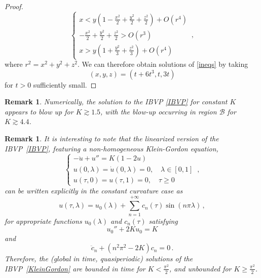 \documentclass[10pt]{amsart}
\newtheorem{Remark}[Thm]{Remark}
\begin{document}
\begin{proof}
\begin{equation} \label{ineqs}
\begin{cases}
x < y \left( 1 - \frac{x^2}2 + \frac{y^2}2 + \frac{z^2}2 \right) + O(r^4) \\
- \frac{x^2}2 + \frac{y^2}2 + \frac{z^2}2 > O(r^3) \\
x > y \left( 1 + \frac{y^2}3 + \frac{z^2}3 \right) + O(r^4) 
\end{cases} 
\, ,
\end{equation}
where $r^2 = x^2 + y^2 + z^2$. We can therefore obtain solutions of \eqref{ineqs} by taking
\begin{equation}
(x,y,z) = (t + 6 t^3, t, 3t)
\end{equation}
for $t>0$ sufficiently small.
\end{proof}

\begin{Remark}
Numerically, the solution to the IBVP \eqref{IBVP} for constant $K$ appears to blow up for $K \gtrsim 1.5$, with the blow-up occurring in region $\mathcal{B}$ for $K \gtrsim 4.4$.
\end{Remark}

\begin{Remark}
It is interesting to note that the linearized version of the IBVP~\ref{IBVP}, featuring a non-homogeneous Klein-Gordon equation,
\begin{equation}
\begin{cases} \label{KleinGordon}
- \ddot{u} + u'' = K (1- 2u) \\
u(0,\lambda)=\dot{u}(0,\lambda)=0, \quad \lambda \in [0,1] \\
u(\tau,0) = u(\tau,1) = 0, \quad \tau\geq 0
\end{cases} \, ,
\end{equation}
can be written explicitly in the constant curvature case as
\begin{equation}
u(\tau,\lambda) = u_0(\lambda) + \sum_{n=1}^{+\infty} c_n(\tau) \sin(n \pi \lambda) \, ,
\end{equation}
for appropriate functions $u_0(\lambda)$ and $c_n(\tau)$ satisfying
\begin{equation}
u_0'' + 2Ku_0 = K
\end{equation}
and
\begin{equation}
\ddot{c}_n + (n^2 \pi^2 - 2K) c_n = 0 \, .
\end{equation}
Therefore, the (global in time, quasiperiodic) solutions of the IBVP~\eqref{KleinGordon} are bounded in time for $K < \frac{\pi^2}2$, and unbounded for $K \geq \frac{\pi^2}2$.
\end{Remark}
%
%
\end{document}
